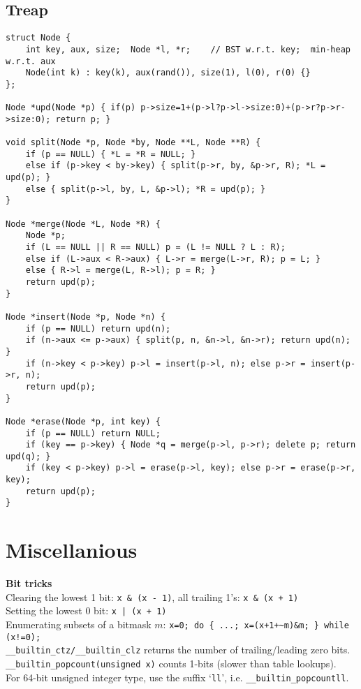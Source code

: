 \documentclass[a4paper, 12pt]{article}
\newcommand{\Section}[1]{
  \section*{#1}
  \addcontentsline{toc}{subsection}{#1}
  \vspace{-3mm}
}
\newcommand{\Topic}[1]{\textbf{#1}}
\begin{document}
\subsection*{Treap}
\vspace{-3mm}
\begin{Verbatim}[fontsize=\small]
struct Node {
    int key, aux, size;  Node *l, *r;    // BST w.r.t. key;  min-heap w.r.t. aux
    Node(int k) : key(k), aux(rand()), size(1), l(0), r(0) {}
};

Node *upd(Node *p) { if(p) p->size=1+(p->l?p->l->size:0)+(p->r?p->r->size:0); return p; }

void split(Node *p, Node *by, Node **L, Node **R) {
    if (p == NULL) { *L = *R = NULL; }
    else if (p->key < by->key) { split(p->r, by, &p->r, R); *L = upd(p); }
    else { split(p->l, by, L, &p->l); *R = upd(p); }
}

Node *merge(Node *L, Node *R) {
    Node *p;
    if (L == NULL || R == NULL) p = (L != NULL ? L : R);
    else if (L->aux < R->aux) { L->r = merge(L->r, R); p = L; }
    else { R->l = merge(L, R->l); p = R; }
    return upd(p);
}

Node *insert(Node *p, Node *n) {
    if (p == NULL) return upd(n);
    if (n->aux <= p->aux) { split(p, n, &n->l, &n->r); return upd(n); }
    if (n->key < p->key) p->l = insert(p->l, n); else p->r = insert(p->r, n);
    return upd(p);
}

Node *erase(Node *p, int key) {
    if (p == NULL) return NULL;
    if (key == p->key) { Node *q = merge(p->l, p->r); delete p; return upd(q); }
    if (key < p->key) p->l = erase(p->l, key); else p->r = erase(p->r, key);
    return upd(p);
}
\end{Verbatim}

\Section{Miscellanious}

\Topic{Bit tricks} \\
Clearing the lowest 1 bit: \verb$x & (x - 1)$, all trailing 1's: \verb$x & (x + 1)$ \\
Setting the lowest 0 bit: \verb$x | (x + 1)$ \\
Enumerating subsets of a bitmask $m$:
\verb|x=0; do { ...; x=(x+1+~m)&m; } while (x!=0);| \\
\verb$__builtin_ctz/__builtin_clz$ returns the number of trailing/leading zero bits. \\
\verb$__builtin_popcount(unsigned x)$ counts 1-bits (slower than table lookups). \\
For 64-bit unsigned integer type, use the suffix `\verb$ll$', i.e. \verb$__builtin_popcountll$.
\end{document}
